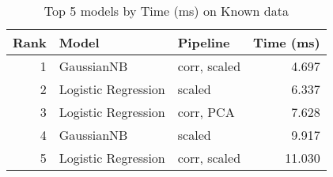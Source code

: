 \begin{table}[!htb]
\caption{Top 5 models by Time (ms) on Known data}
\label{table-top-5-time-(ms)-known}
\centering
\begin{tabular}{rllr}
\toprule
Rank & Model & Pipeline & Time (ms) \\
\midrule
1 & GaussianNB & corr, scaled & 4.697 \\
2 & Logistic Regression & scaled & 6.337 \\
3 & Logistic Regression & corr, PCA & 7.628 \\
4 & GaussianNB & scaled & 9.917 \\
5 & Logistic Regression & corr, scaled & 11.030 \\
\bottomrule
\end{tabular}
\end{table}

